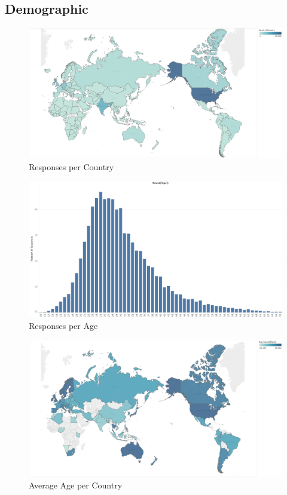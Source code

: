 \documentclass[listof=totoc]{scrartcl}
\begin{document}
\subsection{Demographic}
\begin{figure}
    \centering
    \includegraphics[width=\textwidth]{Documentation/images/map.png}
    \caption{Responses per Country}
    \label{fig:country_responses}
\end{figure}
\begin{figure}
    \centering
    \includegraphics[width=\textwidth]{Documentation/images/age.png}
    \caption{Responses per Age}
    \label{fig:age_responses}
\end{figure}
\begin{figure}
    \centering
    \includegraphics[width=\textwidth]{Documentation/images/average_age.png}
    \caption{Average Age per Country}
    \label{fig:average_age}
\end{figure}
\end{document}
